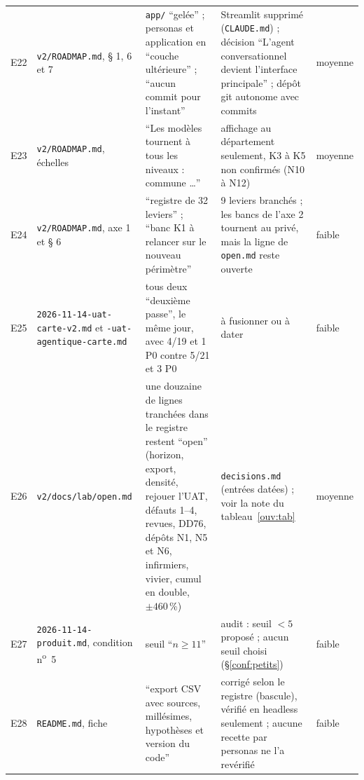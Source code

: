 \begin{small}
\begin{longtable}{@{}p{}p{}p{}p{}p{}@{}}
E22 & \texttt{v2/\allowbreak{}ROADMAP.md}, § 1, 6 et 7 & \texttt{app/\allowbreak{}} \enquote{gelée} ; personas et application en \enquote{couche ultérieure} ; \enquote{aucun commit pour l'instant} & Streamlit supprimé (\texttt{CLAUDE.md}) ; décision \enquote{L'agent conversationnel devient l'interface principale} ; dépôt git autonome avec commits & moyenne \\
E23 & \texttt{v2/\allowbreak{}ROADMAP.md}, échelles & \enquote{Les modèles tournent à tous les niveaux : commune \ldots} & affichage au département seulement, K3 à K5 non confirmés (N10 à N12) & moyenne \\
E24 & \texttt{v2/\allowbreak{}ROADMAP.md}, axe 1 et § 6 & \enquote{registre de 32 leviers} ; \enquote{banc K1 à relancer sur le nouveau périmètre} & 9\mesure{} leviers branchés ; les bancs de l'axe 2 tournent au privé, mais la ligne de \texttt{open.md} reste ouverte & faible \\
E25 & \texttt{2026-\allowbreak{}11-\allowbreak{}14-\allowbreak{}uat-\allowbreak{}carte-\allowbreak{}v2.md} et \texttt{-\allowbreak{}uat-\allowbreak{}agentique-\allowbreak{}carte.md} & tous deux \enquote{deuxième passe}, le même jour, avec 4/19\mesure{} et 1 P0 contre 5/21\mesure{} et 3 P0 & à fusionner ou à dater & faible \\
E26 & \texttt{v2/\allowbreak{}docs/\allowbreak{}lab/\allowbreak{}open.md} & une douzaine\derive{} de lignes tranchées dans le registre restent \enquote{open} (horizon, export, densité, rejouer l'UAT, défauts 1--4, revues, DD76, dépôts N1, N5 et N6, infirmiers, vivier, cumul en double, $\pm460$\,\%) & \texttt{decisions.md} (entrées datées) ; voir la note du tableau~\ref{ouv:tab} & moyenne \\
E27 & \texttt{2026-\allowbreak{}11-\allowbreak{}14-\allowbreak{}produit.md}, condition n\textsuperscript{o}~5 & seuil \enquote{$n\geq11$} & audit : seuil $<5$ proposé ; aucun seuil choisi (§\ref{conf:petits}) & faible \\
E28 & \texttt{README.md}, fiche & \enquote{export CSV avec sources, millésimes, hypothèses et version du code} & corrigé selon le registre (bascule), vérifié en headless seulement ; aucune recette par personas ne l'a revérifié & faible \\
\end{longtable}
\end{small}
\endgroup

